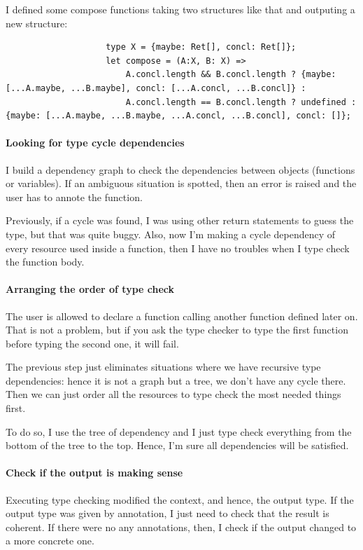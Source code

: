 \documentclass{article}
\begin{document}
				I defined some compose functions taking two structures like that and outputing a new structure:
				\begin{lstlisting}
					type X = {maybe: Ret[], concl: Ret[]};
					let compose = (A:X, B: X) =>
						A.concl.length && B.concl.length ? {maybe: [...A.maybe, ...B.maybe], concl: [...A.concl, ...B.concl]} :
						A.concl.length == B.concl.length ? undefined : {maybe: [...A.maybe, ...B.maybe, ...A.concl, ...B.concl], concl: []};
				\end{lstlisting}

			\paragraph{Looking for type cycle dependencies}
				I build a dependency graph to check the dependencies between objects (functions or variables). If an ambiguous situation is spotted, then an error is raised and the user has to annote the function.

				Previously, if a cycle was found, I was using other return statements to guess the type, but that was quite buggy. Also, now I'm making a cycle dependency of every resource used inside a function, then I have no troubles when I type check the function body.

			\paragraph{Arranging the order of type check}
				The user is allowed to declare a function calling another function defined later on. That is not a problem, but if you ask the type checker to type the first function before typing the second one, it will fail.

				The previous step just eliminates situations where we have recursive type dependencies: hence it is not a graph but a tree, we don't have any cycle there. Then we can just order all the resources to type check the most needed things first.

				To do so, I use the tree of dependency and I just type check everything from the bottom of the tree to the top. Hence, I'm sure all dependencies will be satisfied. 

			\paragraph{Check if the output is making sense} Executing type checking modified the context, and hence, the output type. If the output type was given by annotation, I just need to check that the result is coherent. If there were no any annotations, then, I check if the output changed to a more concrete one.
\end{document}

